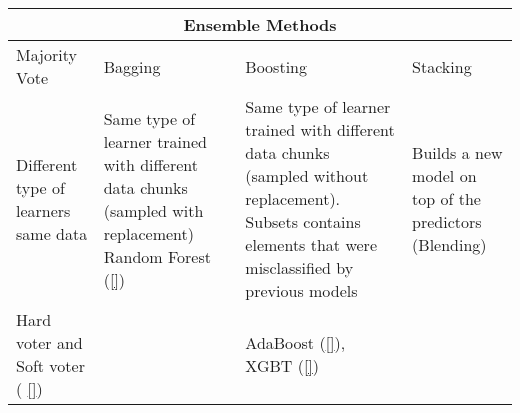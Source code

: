 \documentclass[11pt]{article}
\theoremstyle{definition}
\theoremstyle{remark}
\begin{document}

 \label{tab:ensemblemethods} 
\begin{tabular}{ |p{3cm}||p{3cm}|p{3cm}|p{2cm}| } %
 \hline
 \multicolumn{4}{|c|}{Ensemble Methods} \\
 \hline

 Majority Vote & Bagging & Boosting & Stacking\\
 \hline
 Different type of learners same data & Same type of learner trained with different data chunks (sampled with replacement) Random Forest (\ref{})  & Same type of learner trained with different data chunks (sampled without replacement). Subsets contains elements that were misclassified by previous models &  Builds a new model on top of the predictors (Blending) \\
 Hard voter and Soft voter ( \ref{})			  &                & AdaBoost (\ref{}), XGBT (\ref{})&  \\
 \hline

\end{tabular}
\end{document}

